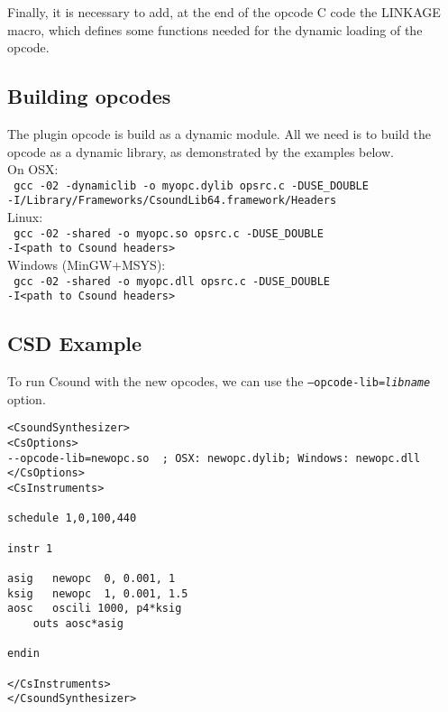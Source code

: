 \documentclass[11pt]{article}
\begin{document}
Finally, it is necessary to add, at the end of the opcode C code the LINKAGE macro, which defines some functions needed for the dynamic loading of the opcode. 

\subsection{Building opcodes} 

The plugin opcode is build as a dynamic module. All we need is to build the opcode as a dynamic library, as demonstrated by the examples below. \\

On OSX:\\

{\tt
gcc -02 -dynamiclib -o myopc.dylib opsrc.c -DUSE\_DOUBLE \\
    -I/Library/Frameworks/CsoundLib64.framework/Headers}\\

Linux:\\

{\tt
gcc -02 -shared -o myopc.so opsrc.c -DUSE\_DOUBLE \\
    -I<path to Csound headers>
}\\

Windows (MinGW+MSYS):\\

{\tt
gcc -02 -shared -o myopc.dll opsrc.c -DUSE\_DOUBLE \\
    -I<path to Csound headers>
}\\

\subsection{CSD Example}

To run Csound with the new opcodes, we can use the {\tt --opcode-lib=\emph{libname}} option.

\begin{lstlisting}
<CsoundSynthesizer>
<CsOptions>
--opcode-lib=newopc.so  ; OSX: newopc.dylib; Windows: newopc.dll
</CsOptions>
<CsInstruments>

schedule 1,0,100,440

instr 1

asig   newopc  0, 0.001, 1
ksig   newopc  1, 0.001, 1.5
aosc   oscili 1000, p4*ksig
    outs aosc*asig

endin

</CsInstruments>
</CsoundSynthesizer>
\end{lstlisting}
\end{document}
